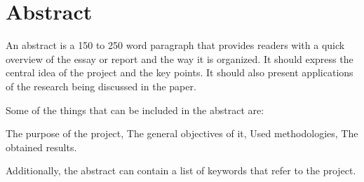 \chapter*{Abstract}

\par An abstract is a 150 to 250 word paragraph that provides readers with a quick overview of the essay or report and the way it is organized. It should express the central idea of the project and the key points. It should also present applications of the research being discussed in the paper.
\par Some of the things that can be included in the abstract are:
\begin{itemize}
    \hitem The purpose of the project,
    \hitem The general objectives of it,
    \hitem Used methodologies,
    \hitem The obtained results.
\end{itemize}
\par Additionally, the abstract can contain a list of keywords that refer to the project.

\clearpage